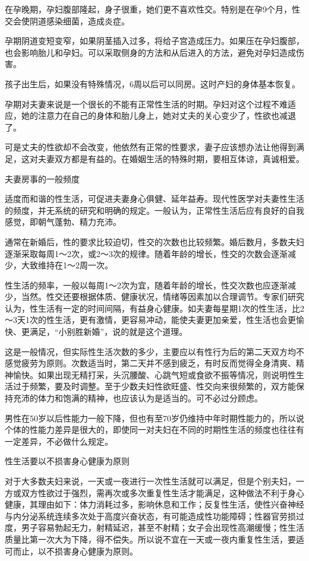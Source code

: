 \documentclass[12pt,UTF8]{ctexbook}
\begin{document}
在孕晚期，孕妇腹部隆起，身子很重，她们更不喜欢性交。特别是在孕9个月，性交会使阴道感染细菌，造成炎症。

孕期阴道变短变窄，如果阴茎插入过多，将给子宫造成压力。如果压在孕妇腹部，也会影响胎儿和孕妇。可以采取侧身的方法和从后进入的方法，避免对孕妇造成伤害。

孩子出生后，如果没有特殊情况，6周以后可以同房。这时产妇的身体基本恢复。

孕期对夫妻来说是一个很长的不能有正常性生活的时期。孕妇对这个过程不难适应，她的注意力在自己的身体和胎儿身上，她对丈夫的关心变少了，性欲也减退了。

可是丈夫的性欲却不会改变，他依然有正常的性要求，妻子应该想办法让他得到满足，这对夫妻双方都是有益的。在婚姻生活的特殊时期，要相互体谅，真诚相爱。





夫妻房事的一般频度


适度而和谐的性生活，可促进夫妻身心俱健、延年益寿。现代性医学对夫妻性生活的频度，并无系统的研究和明确的规定。一般认为，正常性生活后应有良好的自我感觉，即朝气蓬勃、精力充沛。

通常在新婚后，性的要求比较迫切，性交的次数也比较频繁。婚后数月，多数夫妇逐渐采取每周1～2次，或2～3次的规律。随着年龄的增长，性交的次数会逐渐减少，大致维持在1～2周一次。

性生活的频率，一般以每周1～2次为宜，随着年龄的增长，性交次数也应逐渐减少，当然。性交还要根据体质、健康状况，情绪等因素加以合理调节。专家们研究认为，性生活有一定的时间间隔，有益身心健康。如夫妻每星期1次的性生活，比2～3天1次的性生活，更有激情，更容易冲动，能使夫妻更加亲爱，性生活也会更愉快、更满足，“小别胜新婚”，说的就是这个道理。

这是一般情况，但实际性生活次数的多少，主要应以有性行为后的第二天双方均不感觉疲劳为原则。次数适当时，第二天并不感到疲乏，有时反而觉得全身清爽、精神愉快。如果出现无精打采，头沉腰酸、心跳气短或食欲不振等情况，则说明性生活过于频繁，要及时调整。至于少数夫妇性欲旺盛、性交向来很频繁的，双方能保持充沛的体力和饱满的精神，也应该认为是适当的。可不必过分顾虑。

男性在50岁以后性能力一般下降，但也有至70岁仍维持中年时期性能力的，所以说个体的性能力差异是很大的，即使同一对夫妇在不同的时期性生活的频度也往往有一定差异，不必做什么规定。





性生活要以不损害身心健康为原则


对于大多数夫妇来说，一天或一夜进行一次性生活就可以满足，但是个别夫妇，一方或双方性欲过于强烈，需再次或多次重复性生活才能满足，这种做法不利于身心健康，其理由如下：体力消耗过多，影响休息和工作；反复性生活，使性兴奋神经与内分泌系统连续多次处于高度兴奋状态，有可能造成性功能障碍；性器官劳损过度，男子容易勃起无力，射精延迟，甚至不射精；女子会出现性高潮缓慢；性生活质量比第一次大为下降，得不偿失。所以说不宜在一天或一夜内重复性生活，要适可而止，以不损害身心健康为原则。
\end{document}
